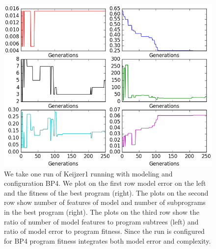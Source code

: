 \begin{figure}[htbp]
\begin{center}
\includegraphics[width=0.99\linewidth]{sections/figures/figure_reptree.png}
\caption{We take one run of Keijzer1 running with \REPTREE modeling and configuration BP4.   We plot on the first row  model error on the left and the fitness of the best program (right).  The plots on the second row show number of features of model  and number of subprograms in the best program (right). The plots on the third row show the ratio of number of model features to program subtrees (left) and ratio of model error to program fitness. Since the run is configured for  BP4 program fitness integrates both model error and complexity.}
\label{fig:deepdive}
\end{center}
\end{figure}

